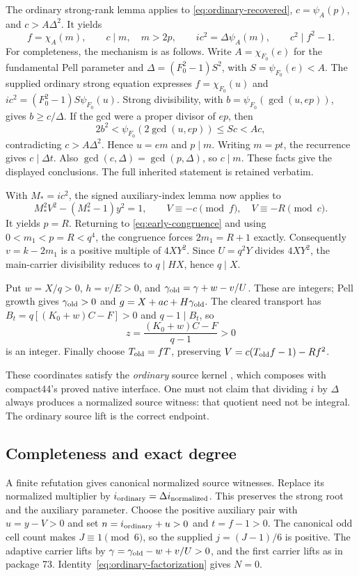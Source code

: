 \documentclass[11pt]{article}
\theoremstyle{definition}
\theoremstyle{remark}
\begin{document}
The ordinary strong-rank lemma \cite{ordinary} applies to
\eqref{eq:ordinary-recovered}, $c=\psi_A(p)$, and $c>A\Delta^2$.
It yields
\[
 f=\chi_A(m),\qquad c\mid m,\quad m>2p,
 \qquad ic^2=\Delta\psi_A(m),\qquad c^2\mid f^2-1.
\]
For completeness, the mechanism is as follows. Write
$A=\chi_{F_0}(e)$ for the fundamental Pell parameter and
$\Delta=(F_0^2-1)S^2$, with $S=\psi_{F_0}(e)<A$. The supplied ordinary
strong equation expresses $f=\chi_{F_0}(u)$ and
$ic^2=(F_0^2-1)S\psi_{F_0}(u)$. Strong divisibility, with
$b=\psi_{F_0}(\gcd(u,ep))$, gives $b\ge c/\Delta$. If the gcd were a
proper divisor of $ep$, then
\[
 2b^2<\psi_{F_0}(2\gcd(u,ep))\le Sc<Ac,
\]
contradicting $c>A\Delta^2$. Hence $u=em$ and $p\mid m$. Writing $m=pt$,
the recurrence gives $c\mid\Delta t$. Also
$\gcd(c,\Delta)=\gcd(p,\Delta)$, so $c\mid m$. These facts give the
displayed conclusions. The full inherited statement is retained verbatim.

With $M_*=ic^2$, the signed auxiliary-index lemma
\cite{source61} now applies to
\[
 M_*^2V^2-(M_*^2-1)y^2=1,
 \qquad V\equiv-c\pmod f,\quad V\equiv-R\pmod c.
\]
It yields $p=R$. Returning to \eqref{eq:early-congruence} and using
$0<m_1<p=R<q^4$, the congruence forces $2m_1=R+1$ exactly.
Consequently $v=k-2m_1$ is a positive multiple of $4XY^2$.
Since $U=q^2Y$ divides $4XY^2$, the main-carrier divisibility reduces to
$q\mid HX$, hence $q\mid X$.

Put $w=X/q>0$, $h=v/E>0$, and
$\gamma_{\rm old}=\gamma+w-v/U$. These are integers; Pell growth gives
$\gamma_{\rm old}>0$ and
$g=X+ac+H\gamma_{\rm old}$. The cleared transport has
$B_t=q[(K_0+w)C-F]>0$ and $q-1\mid B_t$, so
\[
 z=\frac{(K_0+w)C-F}{q-1}>0
\]
is an integer. Finally choose $T_{\rm old}=fT$, preserving
$V=c(T_{\rm old}f-1)-Rf^2$.

These coordinates satisfy the \emph{ordinary} source kernel
\cite{ordinary}, which composes with compact44's proved native interface.
One must not claim that dividing $i$ by $\Delta$ always produces a normalized
source witness: that quotient need not be integral. The ordinary source
lift is the correct endpoint.

\subsection{Completeness and exact degree}

A finite refutation gives canonical normalized source witnesses. Replace
its normalized multiplier by
$i_{\rm ordinary}=\Delta i_{\rm normalized}$. This preserves the strong
root and the auxiliary parameter. Choose the positive auxiliary pair with
$u=y-V>0$ and set $n=i_{\rm ordinary}+u>0$ and $t=f-1>0$.
The canonical odd cell count makes $J\equiv1\pmod6$, so the supplied
$j=(J-1)/6$ is positive. The adaptive carrier lifts by
$\gamma=\gamma_{\rm old}-w+v/U>0$, and the first carrier lifts as in
package 73. Identity~\eqref{eq:ordinary-factorization} gives $N=0$.
\end{document}
